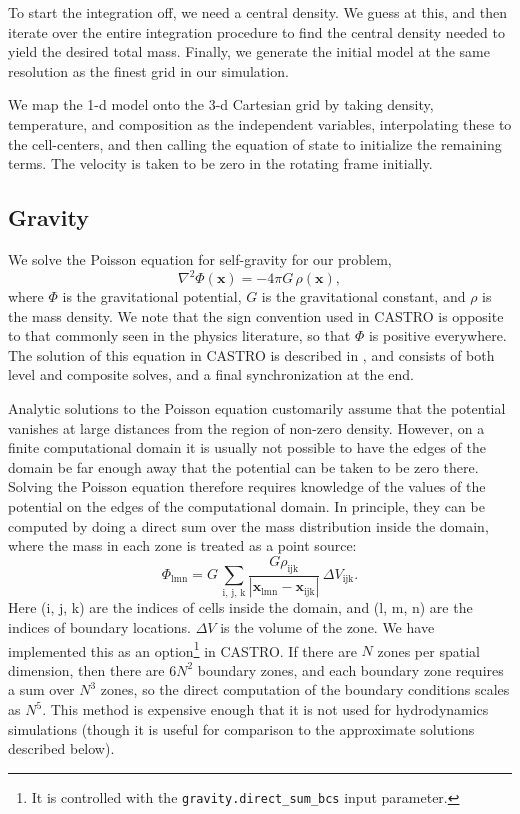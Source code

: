 \documentclass[12pt,preprint]{aastex}
\begin{document}
To start the integration off, we need a central density.  We guess at
this, and then iterate over the entire integration procedure to find
the central density needed to yield the desired total mass.  Finally,
we generate the initial model at the same resolution as the finest
grid in our simulation.

We map the 1-d model onto the 3-d Cartesian grid by taking density,
temperature, and composition as the independent variables,
interpolating these to the cell-centers, and then calling the equation
of state to initialize the remaining terms.  The velocity is taken to
be zero in the rotating frame initially.

\subsection{Gravity}

We solve the Poisson equation for self-gravity for our problem,
\begin{equation}
  \nabla^2 \Phi(\mathbf{x}) = -4\pi G\, \rho(\mathbf{x}),
\end{equation}
where $\Phi$ is the gravitational potential, $G$ is the gravitational constant, and $\rho$ is the mass density. We note that the sign convention used in CASTRO is opposite to that commonly seen in the physics literature, so that $\Phi$ is positive everywhere. The solution of this equation in CASTRO is described in \cite{castro}, and consists of both level and composite solves, and a final synchronization at the end.

Analytic solutions to the Poisson equation customarily assume that the potential vanishes at large distances from the region of non-zero density. However, on a finite computational domain it is usually not possible to have the edges of the domain be far enough away that the potential can be taken to be zero there. Solving the Poisson equation therefore requires knowledge of the values of the potential on the edges of the computational domain. In principle, they can be computed by doing a direct sum over the mass distribution inside the domain, where the mass in each zone is treated as a point source:
\begin{equation}
  \Phi_{\text{lmn}} = G\, \sum_{\text{i, j, k}} \frac{G \rho_{\text{ijk}}}{|\mathbf{x}_{\text{lmn}} - \mathbf{x}_{\text{ijk}}|}\, \Delta V_{\text{ijk}}.\label{direct_sum}
\end{equation}
Here (i, j, k) are the indices of cells inside the domain, and (l, m, n) are the indices of boundary locations. $\Delta V$ is the volume of the zone. We have implemented this as an option\footnote{It is controlled with the \texttt{gravity.direct\_sum\_bcs} input parameter.} in CASTRO. If there are $N$ zones per spatial dimension, then there are $6 N^2$ boundary zones, and each boundary zone requires a sum over $N^3$ zones, so the direct computation of the boundary conditions scales as $N^5$.  This method is expensive enough that it is not used for hydrodynamics simulations (though it is useful for comparison to the approximate solutions described below).
\end{document}
